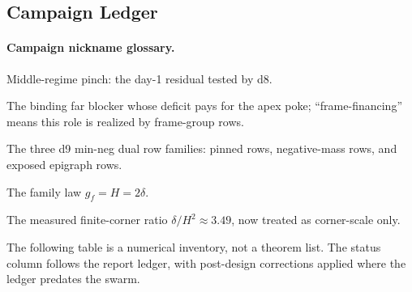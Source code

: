 \subsection{Campaign Ledger}

\paragraph{Campaign nickname glossary.}
\begin{description}[leftmargin=1.1in,style=nextline]
\item[MRP] Middle-regime pinch: the day-1 residual tested by d8.
\item[Financier] The binding far blocker whose deficit pays for the apex poke;
``frame-financing'' means this role is realized by frame-group rows.
\item[pin/neg/epi] The three d9 min-neg dual row families: pinned rows,
negative-mass rows, and exposed epigraph rows.
\item[Budget line] The family law \(g_f=H=2\delta\).
\item[Flat floor] The measured finite-corner ratio
\(\delta/H^2\approx3.49\), now treated as corner-scale only.
\end{description}

\begin{warning}
\numbadge The following table is a numerical inventory, not a theorem list.
The status column follows the report ledger, with post-design corrections
applied where the ledger predates the swarm.
\end{warning}

